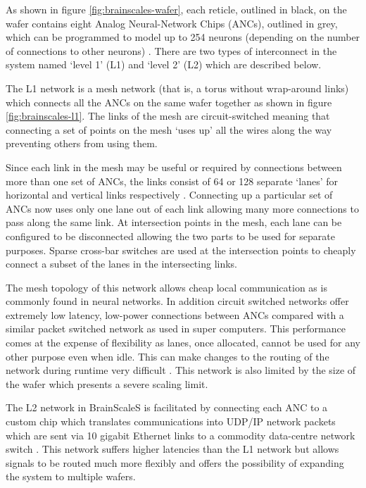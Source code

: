 				As shown in figure \ref{fig:brainscales-wafer}, each reticle, outlined
				in black, on the wafer contains eight Analog Neural-Network Chips
				(ANCs), outlined in grey, which can be programmed to model up to 254
				neurons (depending on the number of connections to other neurons)
				\cite{schemmel10}. There are two types of interconnect in the system
				named `level 1' (L1) and `level 2' (L2) which are described below.
			
				The L1 network is a mesh network (that is, a torus without wrap-around
				links) which connects all the ANCs on the same wafer together as shown
				in figure \ref{fig:brainscales-l1}. The links of the mesh are
				circuit-switched meaning that connecting a set of points on the mesh
				`uses up' all the wires along the way preventing others from using them.
				
				Since each link in the mesh may be useful or required by connections
				between more than one set of ANCs, the links consist of 64 or 128
				separate `lanes' for horizontal and vertical links respectively
				\cite{fieres08}. Connecting up a particular set of ANCs now uses only
				one lane out of each link allowing many more connections to pass along
				the same link. At intersection points in the mesh, each lane can be
				configured to be disconnected allowing the two parts to be used for
				separate purposes. Sparse cross-bar switches are used at the
				intersection points to cheaply connect a subset of the lanes in the
				intersecting links.
				
				The mesh topology of this network allows cheap local communication as is
				commonly found in neural networks.  In addition circuit switched
				networks offer extremely low latency, low-power connections between ANCs
				compared with a similar packet switched network as used in super
				computers. This performance comes at the expense of flexibility as
				lanes, once allocated, cannot be used for any other purpose even when
				idle. This can make changes to the routing of the network during runtime
				very difficult \cite{dally04}. This network is also limited by the size
				of the wafer which presents a severe scaling limit.
				
				The L2 network in BrainScaleS is facilitated by connecting each ANC to a
				custom chip which translates communications into UDP/IP network packets
				which are sent via 10 gigabit Ethernet links to a commodity data-centre
				network switch \cite{schemmel10}. This network suffers higher latencies
				than the L1 network but allows signals to be routed much more flexibly
				and offers the possibility of expanding the system to multiple wafers.
				
